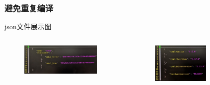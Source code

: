 \documentclass[12pt]{ctexbeamer}
\begin{document}
\begin{frame}
  \frametitle{避免重复编译}
     \begin{block}{json文件展示图}
         \begin{columns}
             \begin{column}{0.3\textwidth}
                \begin{figure}
		        \includegraphics[width=0.9\textwidth]{figures/static_info.png}
                \end{figure}
             \end{column}    
            \begin{column}{0.3\textwidth}
                \begin{figure}
		        \includegraphics[width=0.9\textwidth]{figures/env_info.png}
                \end{figure}
            \end{column}
            \begin{column}{0.4\textwidth}
                \begin{figure}

\end{figure}
\end{column}
\end{columns}
\end{block}
\end{frame}
\end{document}

